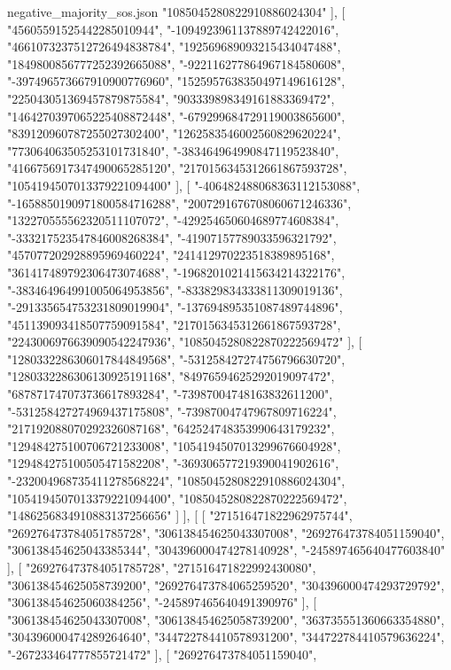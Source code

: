 \begin{filecontents*}[overwrite]{negative_majority_sos.json}
    "1085045280822910886024304"
   ],
   [
    "45605591525442285010944",
    "-1094923961137889742422016",
    "4661073237512726494838784",
    "192569689093215434047488",
    "1849800856777252392665088",
    "-922116277864967184580608",
    "-397496573667910900776960",
    "1525957638350497149616128",
    "225043051369457879875584",
    "903339898349161883369472",
    "1464270397065225408872448",
    "-679299684729119003865600",
    "839120960787255027302400",
    "1262583546002560829620224",
    "773064063505253101731840",
    "-383464964990847119523840",
    "4166756917347490065285120",
    "2170156345312661867593728",
    "1054194507013379221094400"
   ],
   [
    "-406482488068363112153088",
    "-1658850190971800584716288",
    "2007291676708060671246336",
    "132270555562320511107072",
    "-429254650604689774608384",
    "-333217523547846008268384",
    "-41907157789033596321792",
    "457077202928895969460224",
    "241412970223518389895168",
    "361417489792306473074688",
    "-1968201021415634214322176",
    "-383464964991005064953856",
    "-833829834333811309019136",
    "-291335654753231809019904",
    "-137694895351087489744896",
    "451139093418507759091584",
    "2170156345312661867593728",
    "2243006976639090542247936",
    "1085045280822870222569472"
   ],
   [
    "1280332286306017844849568",
    "-531258427274756796630720",
    "1280332286306130925191168",
    "84976594625292019097472",
    "687871747073736617893284",
    "-73987004748163832611200",
    "-531258427274969437175808",
    "-73987004747967809716224",
    "217192088070292326087168",
    "642524748353990643179232",
    "129484275100706721233008",
    "1054194507013299676604928",
    "129484275100505471582208",
    "-369306577219390041902616",
    "-232004968735411278568224",
    "1085045280822910886024304",
    "1054194507013379221094400",
    "1085045280822870222569472",
    "1486256834910883137256656"
   ]
  ],
  [
   [
    "271516471822962975744",
    "269276473784051785728",
    "306138454625043307008",
    "269276473784051159040",
    "306138454625043385344",
    "304396000474278140928",
    "-245897465640477603840"
   ],
   [
    "269276473784051785728",
    "271516471822992430080",
    "306138454625058739200",
    "269276473784065259520",
    "304396000474293729792",
    "306138454625060384256",
    "-245897465640491390976"
   ],
   [
    "306138454625043307008",
    "306138454625058739200",
    "363735551360663354880",
    "304396000474289264640",
    "344722784410578931200",
    "344722784410579636224",
    "-267233464777855721472"
   ],
   [
    "269276473784051159040",

\end{filecontents*}
